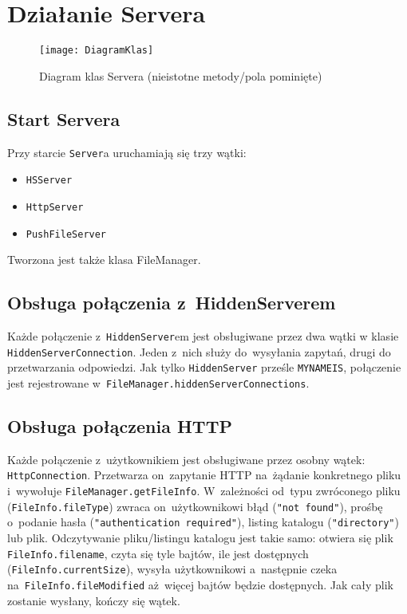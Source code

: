 \documentclass[a4paper,notitlepage]{article}
\begin{document}
\pagestyle{fancy}
\tableofcontents
\section{Działanie Servera}
\begin{figure}
\texttt{[image: DiagramKlas]}
\caption{Diagram klas Servera (nieistotne metody/pola pominięte)}
\end{figure}
\subsection{Start Servera}
Przy starcie \texttt{Server}a uruchamiają się trzy wątki: 
\begin{itemize}
\item \texttt{HSServer}
\item \texttt{HttpServer}
\item \texttt{PushFileServer}
\end{itemize}
Tworzona jest także klasa FileManager.

\subsection{Obsługa połączenia z~HiddenServerem}
Każde połączenie z~\texttt{HiddenServer}em jest obsługiwane przez 
dwa wątki w klasie \texttt{HiddenServerConnection}. Jeden z~nich służy 
do~wysyłania zapytań, drugi do przetwarzania odpowiedzi.
Jak tylko \texttt{HiddenServer} prześle \texttt{MYNAMEIS},
połączenie jest rejestrowane w~\texttt{FileManager.hiddenServerConnections}.

\subsection{Obsługa połączenia HTTP}
Każde połączenie z~użytkownikiem jest obsługiwane przez osobny wątek: 
\texttt{HttpConnection}. Przetwarza on~zapytanie HTTP na~żądanie konkretnego
pliku i~wywołuje \texttt{FileManager.getFileInfo}. W~zależności od~typu 
zwróconego pliku (\texttt{FileInfo.fileType}) zwraca on~użytkownikowi błąd 
(\texttt{"not found"}), prośbę o~podanie hasła 
(\texttt{"authentication required"}), 
listing katalogu (\texttt{"directory"}) lub plik.
Odczytywanie pliku/listingu katalogu jest takie samo:
otwiera się plik \texttt{FileInfo.filename}, czyta się tyle bajtów, ile jest
dostępnych (\texttt{FileInfo.currentSize}), wysyła użytkownikowi a~następnie 
czeka na~\texttt{FileInfo.fileModified} aż~więcej bajtów będzie dostępnych. 
Jak cały plik zostanie wysłany, kończy się wątek.
\end{document}
